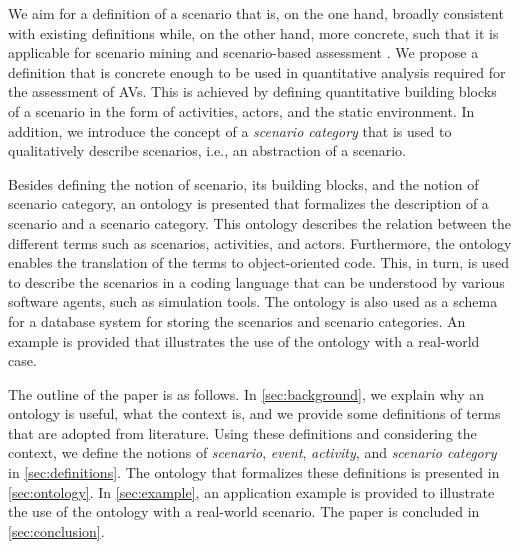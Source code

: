 We aim for a definition of a scenario that is, on the one hand, broadly consistent with existing definitions \cite{geyer2014, ulbrich2015, elrofai2016scenario} while, on the other hand, more concrete, such that it is applicable for scenario mining \cite{elrofai2016scenario} and scenario-based assessment \cite{stellet2015taxonomy, deGelder2017assessment}. We propose a definition that is concrete enough to be used in quantitative analysis required for the assessment of AVs. This is achieved by defining quantitative building blocks of a scenario in the form of activities, actors, and the static environment. In addition, we introduce the concept of a \cbstartd\emph{scenario category} \cbend 
that is used to qualitatively describe scenarios, i.e., an abstraction of a scenario. 

\cbstartb
Besides defining the notion of scenario, its building blocks, and the notion of scenario category, an ontology is presented that formalizes the description of a scenario and a scenario category. 
This ontology describes the relation between the different terms such as scenarios, activities, and actors.
Furthermore, the ontology enables the translation of the terms to object-oriented code.
This, in turn, is used to describe the scenarios in a coding language that can be understood by various software agents, such as simulation tools.
The ontology is also used as a schema for a database system for storing the scenarios and scenario categories.
An example is provided that illustrates the use of the ontology with a real-world case.
\cbend

The outline of the paper is as follows. In \cref{sec:background}, we explain why an ontology is useful, what the context is, and we provide some definitions of terms that are adopted from literature. 
Using these definitions and considering the context, we define the notions of \emph{scenario}, \emph{event}, \emph{activity}, and \cbstartd\emph{scenario category} \cbend in \cref{sec:definitions}. 
The ontology that formalizes these definitions is presented in \cref{sec:ontology}. 
In \cref{sec:example}, an application example is provided to illustrate the use of the ontology with a real-world scenario. 
The paper is concluded in \cref{sec:conclusion}.
